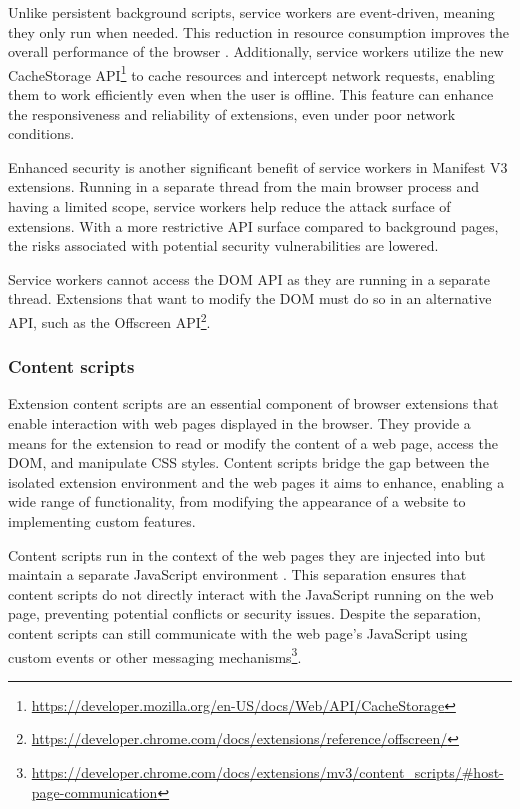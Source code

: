 Unlike persistent background scripts, service workers are event-driven, meaning they only run when needed. This reduction in resource consumption improves the overall performance of the browser \cite{ChromeWebExtensions}. Additionally, service workers utilize the new CacheStorage API\footnote{\url{https://developer.mozilla.org/en-US/docs/Web/API/CacheStorage}} to cache resources and intercept network requests, enabling them to work efficiently even when the user is offline. This feature can enhance the responsiveness and reliability of extensions, even under poor network conditions.

Enhanced security is another significant benefit of service workers in Manifest V3 extensions. Running in a separate thread from the main browser process and having a limited scope, service workers help reduce the attack surface of extensions. With a more restrictive API surface compared to background pages, the risks associated with potential security vulnerabilities are lowered.

Service workers cannot access the DOM API as they are running in a separate thread. Extensions that want to modify the DOM must do so in an alternative API, such as the Offscreen API\footnote{\url{https://developer.chrome.com/docs/extensions/reference/offscreen/}}.

\subsubsection{Content scripts}

Extension content scripts are an essential component of browser extensions that enable interaction with web pages displayed in the browser. They provide a means for the extension to read or modify the content of a web page, access the DOM, and manipulate CSS styles. Content scripts bridge the gap between the isolated extension environment and the web pages it aims to enhance, enabling a wide range of functionality, from modifying the appearance of a website to implementing custom features.

Content scripts run in the context of the web pages they are injected into but maintain a separate JavaScript environment \cite{ChromeWebExtensions}. This separation ensures that content scripts do not directly interact with the JavaScript running on the web page, preventing potential conflicts or security issues. Despite the separation, content scripts can still communicate with the web page's JavaScript using custom events or other messaging mechanisms\footnote{\url{https://developer.chrome.com/docs/extensions/mv3/content_scripts/\#host-page-communication}}.

